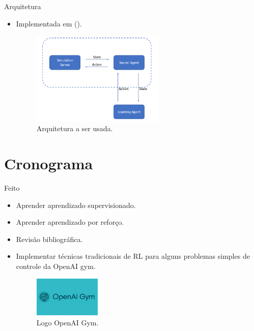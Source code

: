\documentclass{beamer}
\begin{document}
\begin{frame}{Arquitetura}
\begin{itemize}
\item
	Implementada em (\cite{TGMuzio}).
\begin{figure}[h!]
   \centering
       \includegraphics[width=0.6\textwidth]{figures/architecture.png}
\caption{Arquitetura a ser usada.}
\end{figure}
\end{itemize}
\end{frame}

\section{Cronograma}

\begin{frame}{Feito}
\begin{itemize}
\item
	Aprender aprendizado supervisionado.
\item
	Aprender aprendizado por reforço.
\item
	Revisão bibliográfica.
\item
	Implementar técnicas tradicionais de RL para alguns problemas simples de controle da OpenAI gym.
\begin{figure}[h!]
   \centering
       \includegraphics[width=0.3\textwidth]{figures/gym.png}
 \caption{Logo OpenAI Gym.}
\end{figure}
\end{itemize}
\end{frame}
\end{document}
